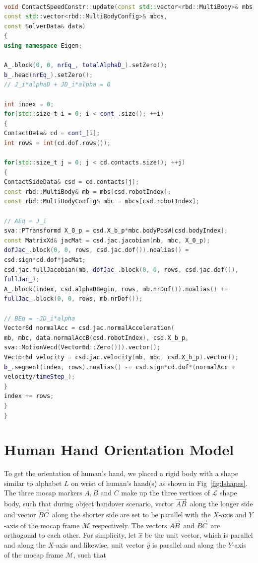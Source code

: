 \documentclass[a4paper, 12pt, oneside]{Thesis}  %
\begin{document}
\begin{lstlisting}[language=C++,basicstyle=\footnotesize, caption={QPContactConstr}]

void ContactSpeedConstr::update(const std::vector<rbd::MultiBody>& mbs,
const std::vector<rbd::MultiBodyConfig>& mbcs,
const SolverData& data)
{
using namespace Eigen;

A_.block(0, 0, nrEq_, totalAlphaD_).setZero();
b_.head(nrEq_).setZero();
// J_i*alphaD + JD_i*alpha = 0

int index = 0;
for(std::size_t i = 0; i < cont_.size(); ++i)
{
ContactData& cd = cont_[i];
int rows = int(cd.dof.rows());

for(std::size_t j = 0; j < cd.contacts.size(); ++j)
{
ContactSideData& csd = cd.contacts[j];
const rbd::MultiBody& mb = mbs[csd.robotIndex];
const rbd::MultiBodyConfig& mbc = mbcs[csd.robotIndex];

// AEq = J_i
sva::PTransformd X_0_p = csd.X_b_p*mbc.bodyPosW[csd.bodyIndex];
const MatrixXd& jacMat = csd.jac.jacobian(mb, mbc, X_0_p);
dofJac_.block(0, 0, rows, csd.jac.dof()).noalias() =
csd.sign*cd.dof*jacMat;
csd.jac.fullJacobian(mb, dofJac_.block(0, 0, rows, csd.jac.dof()),
fullJac_);
A_.block(index, csd.alphaDBegin, rows, mb.nrDof()).noalias() +=
fullJac_.block(0, 0, rows, mb.nrDof());

// BEq = -JD_i*alpha
Vector6d normalAcc = csd.jac.normalAcceleration(
mb, mbc, data.normalAccB(csd.robotIndex), csd.X_b_p,
sva::MotionVecd(Vector6d::Zero())).vector();
Vector6d velocity = csd.jac.velocity(mb, mbc, csd.X_b_p).vector();
b_.segment(index, rows).noalias() -= csd.sign*cd.dof*(normalAcc +
velocity/timeStep_);
}
index += rows;
}
}
\end{lstlisting}


\clearpage
\section{Human Hand Orientation Model}\label{hand_orientation}
To get the orientation of human's hand, we placed a rigid body with a shape similar to alphabet $L$ on wrist of human's hand(s) as shown in Fig~\ref{fig:lshapes}. The three mocap markers $A, B$ and $C$ make up the three vertices of $\mathcal{L}$ shape body, such that during object handover scenario, vector $\vec{AB}^{\,}$ along the longer side and vector $\vec{BC}^{\,}$ along the shorter side are set to be parallel with the $X$-axis and $Y$-axis of the mocap frame $\mathcal{M}$ respectively. The vectors $\vec{AB}^{\,}$ and $\vec{BC}^{\,}$ are orthogonal to each other. For simplicity, let $\hat{x}$ be the unit vector, which is parallel and along the $X$-axis and likewise, unit vector $\hat{y}$ is parallel and along the $Y$-axis of the mocap frame $\mathcal{M}$, such that
\end{document}
